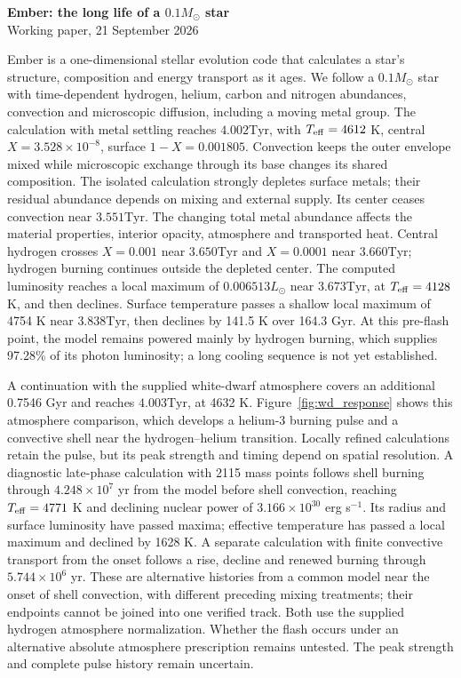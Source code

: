 \documentclass[11pt,letterpaper]{article}
\newcommand{\Ms}{M_\odot}\newcommand{\Rs}{R_\odot}\newcommand{\Ls}{L_\odot}
\newcommand{\Tyr}{\mathrm{Tyr}}
\begin{document}
\begin{center}
{\Large\bfseries Ember: the long life of a $0.1\Ms$ star}\\[8pt]
{\small Working paper, 21 September 2026}
\end{center}

Ember is a one-dimensional stellar evolution code that calculates a star's
structure, composition and energy transport as it ages.
We follow a $0.1\Ms$ star with time-dependent hydrogen, helium, carbon and
nitrogen abundances, convection and microscopic diffusion, including a moving
metal group. The calculation with metal settling reaches $4.002\Tyr$,
with $T_{\rm eff}=4612$ K, central $X=3.528\times10^{-8}$,
surface $1-X=0.001805$. Convection keeps the outer envelope mixed while
microscopic exchange through its base changes its shared composition.
The isolated calculation strongly depletes surface metals; their residual
abundance depends on mixing and external supply.
Its center ceases convection near $3.551\Tyr$. The changing total metal abundance affects the material
properties, interior opacity, atmosphere and transported heat. Central hydrogen crosses $X=0.001$
near $3.650\Tyr$ and $X=0.0001$ near $3.660\Tyr$; hydrogen burning
continues outside the depleted center. The computed luminosity reaches a
local maximum of $0.006513\Ls$ near $3.673\Tyr$, at $T_{\rm eff}=4128$ K,
and then declines. Surface temperature passes a shallow local maximum of 4754 K
near $3.838\Tyr$, then declines by 141.5 K
over 164.3 Gyr. At this pre-flash point, the model remains powered mainly by
hydrogen burning, which supplies 97.28\% of its photon luminosity; a long cooling sequence is not yet established.

A continuation with the supplied white-dwarf atmosphere covers an additional
0.7546 Gyr and reaches $4.003\Tyr$, at 4632 K.
Figure~\ref{fig:wd_response} shows this atmosphere comparison, which develops
a helium-3 burning pulse and a convective shell near the hydrogen--helium
transition. Locally refined calculations retain the pulse, but its peak
strength and timing depend on spatial resolution. A diagnostic late-phase
calculation with 2115 mass points follows shell burning through
$4.248\times10^7$ yr from the model before shell convection, reaching
$T_{\rm eff}=4771$ K and declining nuclear power of
$3.166\times10^{30}$ erg s$^{-1}$. Its radius and surface luminosity have passed maxima; effective temperature has passed a local maximum and declined by 1628 K. A separate calculation with finite
convective transport from the onset follows a rise, decline and renewed
burning through $5.744\times10^6$ yr. These are alternative histories from a
common model near the onset of shell convection, with different preceding
mixing treatments; their endpoints cannot be joined into one verified track.
Both use the supplied hydrogen atmosphere normalization. Whether the flash
occurs under an alternative absolute atmosphere prescription remains untested.
The peak strength and complete pulse history
remain uncertain.
\end{document}
